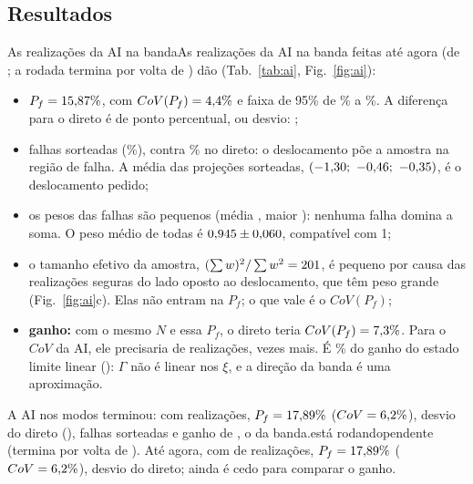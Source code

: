 \documentclass[11pt,a4paper]{article}
\begin{document}
\subsection{Resultados}
\ifaipronto As \NBanda{} realizações da AI na banda\else As \NBanda{} realizações da AI na banda feitas até agora (de
\NAlvoBanda; a rodada termina por volta de \FimBanda)\fi{} dão (Tab.~\ref{tab:ai}, Fig.~\ref{fig:ai}):
\begin{itemize}
\item $P_f = 15{,}87\%$, com $CoV(P_f) = 4{,}4\%$ e faixa de 95\% de \PfBandaLo\% a \PfBandaHi\%. A diferença
para o direto é de \DifBandaPontos{} ponto percentual, ou \DifBanda{} desvio: \ViesBanda;
\item \NfBanda{} falhas sorteadas (\FracFalhaBanda\%), contra \PfDireto\% no direto: o deslocamento põe a amostra na
região de falha. A média das projeções sorteadas, $(-1{,}30;\ -0{,}46;\ -0{,}35)$, é o deslocamento pedido;
\item os pesos das falhas são pequenos (média \PesoFalhaBanda, maior \PesoMaxBanda): nenhuma falha domina a soma. O
peso médio de todas é $0{,}945 \pm 0{,}060$, compatível com 1;
\item o tamanho efetivo da amostra, $(\sum w)^2/\sum w^2 = 201$, é pequeno por causa das realizações seguras do
lado oposto ao deslocamento, que têm peso grande (Fig.~\ref{fig:ai}c). Elas não entram na $P_f$; o que vale é o
$CoV(P_f)$;
\item \textbf{ganho:} com o mesmo $N$ e essa $P_f$, o direto teria $CoV(P_f) = 7{,}3\%$. Para o
$CoV$ da AI, ele precisaria de \NDiretoParaCovBanda{} realizações, \GanhoBanda{} vezes mais. É \FracGanhoBanda\% do
ganho do estado limite linear (\GanhoLinear): $\Gamma$ não é linear nos $\xi$, e a direção da banda é uma aproximação.
\end{itemize}
A AI nos modos \ifmodospronto terminou: com \NModos{} realizações, $P_f = 17{,}89\%$ ($CoV = 6{,}2\%$),
\DifModos{} desvio do direto (\ViesModos), \NfModos{} falhas sorteadas e ganho de \GanhoModos, \ComparaGanho{} o da
banda.\else está \ifmodosiniciado rodando\else pendente\fi{} (termina por volta de \FimModos).\ifmodosiniciado{} Até
agora, com \NModos{} de \NAlvoModos{} realizações, $P_f = 17{,}89\%$ ($CoV = 6{,}2\%$), \DifModos{} desvio do
direto; ainda é cedo para comparar o ganho.\fi\fi
\end{document}
